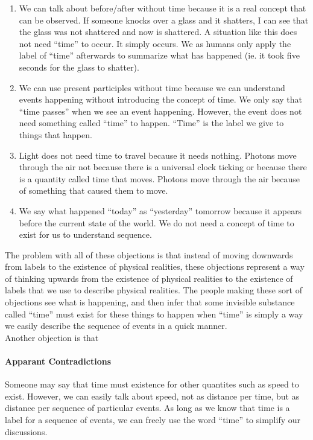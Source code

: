 \documentclass[a4paper, 12pt]{article}
\begin{document}
\begin{enumerate}
  \item We can talk about before/after without time because it is a real concept that can be observed. If someone knocks over a glass and it shatters, I can see that the glass was not shattered and now is shattered. A situation like this does not need ``time'' to occur. It simply occurs. We as humans only apply the label of ``time'' afterwards to summarize what has happened (ie. it took five seconds for the glass to shatter).
  \item We can use present participles without time because we can understand events happening without introducing the concept of time. We only say that ``time passes'' when we see an event happening. However, the event does not need something called ``time'' to happen. ``Time'' is the label we give to things that happen.
  \item Light does not need time to travel because it needs nothing. Photons move through the air not because there is a universal clock ticking or because there is a quantity called time that moves. Photons move through the air because of something that caused them to move.
  \item We say what happened ``today'' as ``yesterday'' tomorrow because it appears before the current state of the world. We do not need a concept of time to exist for us to understand sequence.
\end{enumerate}
The problem with all of these objections is that instead of moving downwards from labels to the existence of physical realities, these objections represent a way of thinking upwards from the existence of physical realities to the existence of labels that we use to describe physical realities. The people making these sort of objections see what is happening, and then infer that some invisible substance called ``time'' must exist for these things to happen when ``time'' is simply a way we easily describe the sequence of events in a quick manner. \\
Another objection is that
\paragraph{Apparant Contradictions}
Someone may say that time must existence for other quantites such as speed to exist. However, we can easily talk about speed, not as distance per time, but as distance per sequence of particular events. As long as we know that time is a label for a sequence of events, we can freely use the word ``time'' to simplify our discussions. \\
\end{document}
